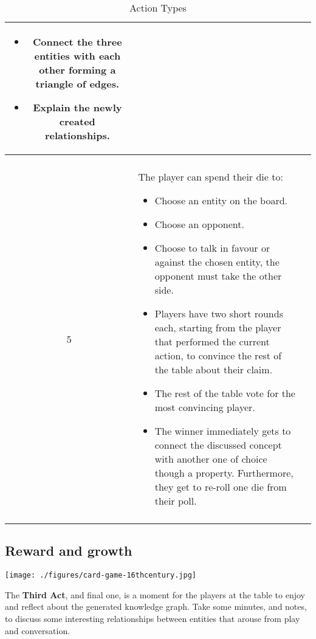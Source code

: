 \documentclass[12pt,a4paper]{book}
\theoremstyle{definition}
\begin{document}
\begin{table}[h!]
\begin{center}
\begin{tabular}{ c  p{3cm}  p{8cm}  }
\begin{itemize}[topsep=0pt]
      \item Connect the three entities with each other forming a triangle of edges.
      \item Explain the newly created relationships.      
       \end{itemize} \\
       \hline
      \cmidrule(r){1-1}\cmidrule(lr){2-2}\cmidrule(l){3-3}
     \raisebox{-\totalheight}{\texttt{[image: ./figures/scales.png]}}
      & 
      \begin{center}
      \Large{Quarrel \\ 5}
      \end{center}
      & 
      The player can spend their die to:
      \begin{itemize}[topsep=0pt]
      \item Choose an entity on the board.
      \item Choose an opponent.
      \item Choose to talk in favour or against the chosen entity, the opponent must take the other side.
      \item Players have two short rounds each, starting from the player that performed the current action, to convince the rest of the table about their claim. 
      \item The rest of the table vote for the most convincing player.
      \item The winner immediately gets to connect the discussed concept with another one of choice though a property. Furthermore, they get to re-roll one die from their poll.       
       \end{itemize} \\
      \\ \bottomrule
      \end{tabular}
      \caption{Action Types}
      \label{action-types}
      \end{center}
      \end{table}
      
\subsection{Reward and growth}

\begin{center}
\texttt{[image: ./figures/card-game-16thcentury.jpg]}
\end{center}



The \textbf{Third Act}, and final one, is a moment for the players at the table to enjoy and reflect about the generated knowledge graph. Take some minutes, and notes, to discuss some interesting relationships between entities that arouse from play and conversation.
\end{document}
